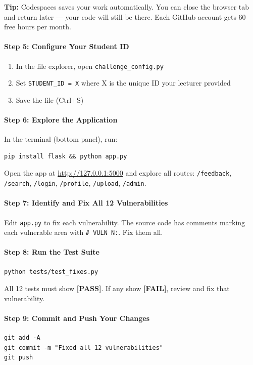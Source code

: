 \documentclass[12pt,a4paper]{article}
\begin{document}
\textbf{Tip:} Codespaces saves your work automatically. You can close the browser tab and return later --- your code will still be there. Each GitHub account gets 60 free hours per month.

\paragraph{Step 5: Configure Your Student ID}
\begin{enumerate}
  \item In the file explorer, open \texttt{challenge\_config.py}
  \item Set \texttt{STUDENT\_ID = X} where X is the unique ID your lecturer provided
  \item Save the file (Ctrl+S)
\end{enumerate}

\paragraph{Step 6: Explore the Application}
In the terminal (bottom panel), run:
\begin{verbatim}
pip install flask && python app.py
\end{verbatim}
Open the app at \url{http://127.0.0.1:5000} and explore all routes:
\texttt{/feedback}, \texttt{/search}, \texttt{/login}, \texttt{/profile}, \texttt{/upload}, \texttt{/admin}.

\paragraph{Step 7: Identify and Fix All 12 Vulnerabilities}
Edit \texttt{app.py} to fix each vulnerability. The source code has comments marking each vulnerable area with \texttt{\# VULN N:}. Fix them all.

\paragraph{Step 8: Run the Test Suite}
\begin{verbatim}
python tests/test_fixes.py
\end{verbatim}
All 12 tests must show \textbf{[PASS]}. If any show \textbf{[FAIL]}, review and fix that vulnerability.

\paragraph{Step 9: Commit and Push Your Changes}
\begin{verbatim}
git add -A
git commit -m "Fixed all 12 vulnerabilities"
git push
\end{verbatim}
\end{document}
